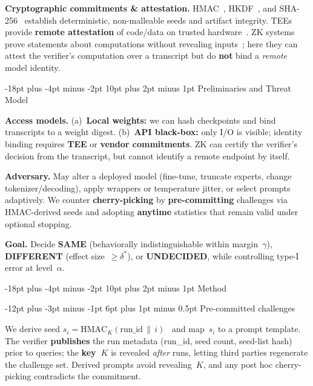 \documentclass[11pt]{article}
\makeatletter
\renewcommand\section{\@startsection{section}{1}{\z@}%
  {-18pt plus -4pt minus -2pt}%
  {10pt plus 2pt minus 1pt}%
  {\normalfont\Large\bfseries}}
\renewcommand\subsection{\@startsection{subsection}{2}{\z@}%
  {-12pt plus -3pt minus -1pt}%
  {6pt plus 1pt minus 0.5pt}%
  {\normalfont\large\bfseries}}
\makeatother
\begin{document}
\textbf{Cryptographic commitments \& attestation.} HMAC~\cite{rfc2104}, HKDF~\cite{rfc5869}, and SHA-256~\cite{fips180-4} establish deterministic, non-malleable seeds and artifact integrity. TEEs provide \textbf{remote attestation} of code/data on trusted hardware~\cite{costan2016sgx}. ZK systems prove statements about computations without revealing inputs~\cite{bensasson2014snarks,bunz2018bulletproofs}; here they can attest the verifier's computation over a transcript but do \textbf{not} bind a \emph{remote} model identity.

\section{Preliminaries and Threat Model}

\textbf{Access models.} (a)~\textbf{Local weights:} we can hash checkpoints and bind transcripts to a weight digest. (b)~\textbf{API black-box:} only I/O is visible; identity binding requires \textbf{TEE} or \textbf{vendor commitments}. ZK can certify the verifier's decision from the transcript, but cannot identify a remote endpoint by itself.

\textbf{Adversary.} May alter a deployed model (fine-tune, truncate experts, change tokenizer/decoding), apply wrappers or temperature jitter, or select prompts adaptively. We counter \textbf{cherry-picking} by \textbf{pre-committing} challenges via HMAC-derived seeds and adopting \textbf{anytime} statistics that remain valid under optional stopping.

\textbf{Goal.} Decide \textbf{SAME} (behaviorally indistinguishable within margin~$\gamma$), \textbf{DIFFERENT} (effect size~${\geq}\delta^*$), or \textbf{UNDECIDED}, while controlling type-I error at level~$\alpha$.

\section{Method}

\subsection{Pre-committed challenges}

We derive seed $s_i = \mathrm{HMAC}_{K}(\text{run\_id}\,\|\,i)$~\cite{rfc2104} and map~$s_i$ to a prompt template. The verifier \textbf{publishes} the run metadata (run\_id, seed count, seed-list hash) prior to queries; the \textbf{key~$K$} is revealed \emph{after} runs, letting third parties regenerate the challenge set. Derived prompts avoid revealing~$K$, and any post hoc cherry-picking contradicts the commitment.
\end{document}
